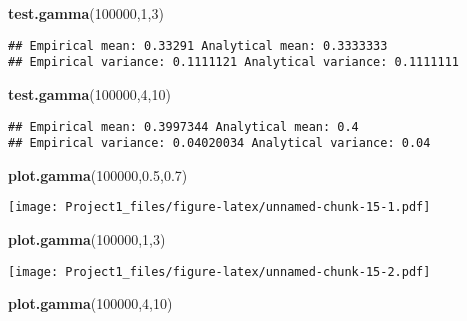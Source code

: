 \documentclass[]{article}
\newenvironment{Shaded}{\begin{snugshade}}{\end{snugshade}}
\newcommand{\DecValTok}[1]{\textcolor[rgb]{0.00,0.00,0.81}{#1}}
\newcommand{\FloatTok}[1]{\textcolor[rgb]{0.00,0.00,0.81}{#1}}
\newcommand{\KeywordTok}[1]{\textcolor[rgb]{0.13,0.29,0.53}{\textbf{#1}}}
\newcommand{\NormalTok}[1]{#1}
\begin{document}
\begin{Shaded}
\begin{Highlighting}[]
\KeywordTok{test.gamma}\NormalTok{(}\DecValTok{100000}\NormalTok{,}\DecValTok{1}\NormalTok{,}\DecValTok{3}\NormalTok{)}
\end{Highlighting}
\end{Shaded}

\begin{verbatim}
## Empirical mean: 0.33291 Analytical mean: 0.3333333 
## Empirical variance: 0.1111121 Analytical variance: 0.1111111
\end{verbatim}

\begin{Shaded}
\begin{Highlighting}[]
\KeywordTok{test.gamma}\NormalTok{(}\DecValTok{100000}\NormalTok{,}\DecValTok{4}\NormalTok{,}\DecValTok{10}\NormalTok{)}
\end{Highlighting}
\end{Shaded}

\begin{verbatim}
## Empirical mean: 0.3997344 Analytical mean: 0.4 
## Empirical variance: 0.04020034 Analytical variance: 0.04
\end{verbatim}

\begin{Shaded}
\begin{Highlighting}[]
\KeywordTok{plot.gamma}\NormalTok{(}\DecValTok{100000}\NormalTok{,}\FloatTok{0.5}\NormalTok{,}\FloatTok{0.7}\NormalTok{)}
\end{Highlighting}
\end{Shaded}

\texttt{[image: Project1\_files/figure-latex/unnamed-chunk-15-1.pdf]}

\begin{Shaded}
\begin{Highlighting}[]
\KeywordTok{plot.gamma}\NormalTok{(}\DecValTok{100000}\NormalTok{,}\DecValTok{1}\NormalTok{,}\DecValTok{3}\NormalTok{)}
\end{Highlighting}
\end{Shaded}

\texttt{[image: Project1\_files/figure-latex/unnamed-chunk-15-2.pdf]}

\begin{Shaded}
\begin{Highlighting}[]
\KeywordTok{plot.gamma}\NormalTok{(}\DecValTok{100000}\NormalTok{,}\DecValTok{4}\NormalTok{,}\DecValTok{10}\NormalTok{)}
\end{Highlighting}
\end{Shaded}
\end{document}
